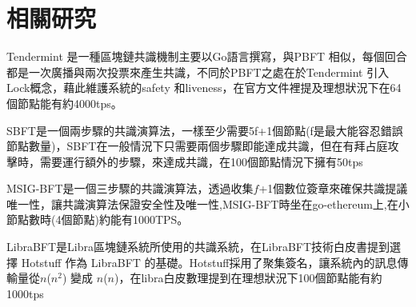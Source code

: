 \chapter{相關研究}\label{se_7}
Tendermint\cite{buchman2016tendermint} 是一種區塊鏈共識機制主要以Go語言撰寫，與PBFT 相似，每個回合都是一次廣播與兩次投票來產生共識，不同於PBFT之處在於Tendermint 引入Lock概念，藉此維護系統的safety 和liveness，在官方文件裡提及理想狀況下在64個節點能有約4000tps。

SBFT\cite{gueta2018sbft}是一個兩步驟的共識演算法，一樣至少需要5f+1個節點(f是最大能容忍錯誤節點數量)，SBFT在一般情況下只需要兩個步驟即能達成共識，但在有拜占庭攻擊時，需要運行額外的步驟，來達成共識，在100個節點情況下擁有50tps

MSIG-BFT是一個三步驟的共識演算法，透過收集$f$+1個數位簽章來確保共識提議唯一性，讓共識演算法保證安全性及唯一性,MSIG-BFT時坐在go-ethereum上,在小節點數時(4個節點)約能有1000TPS。

LibraBFT\cite{STEVE_HANNA2010}是Libra區塊鏈系統所使用的共識系統，在LibraBFT技術白皮書提到選擇 Hotstuff\cite{yin2018hotstuff} 作為 LibraBFT 的基礎。Hotstuff採用了聚集簽名，讓系統內的訊息傳輸量從$n$($n^2$) 變成 $n$($n$)，在libra白皮數理提到在理想狀況下100個節點能有約1000tps
